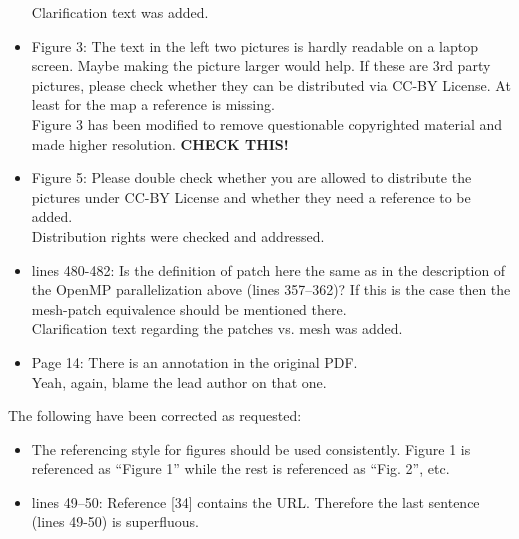 \documentclass{letter}
\newcommand{\alert}[1]{\textbf{\color{red} #1}}
\begin{document}
\begin{letter}
\begin{itemize}
    Clarification text was added. \\

    \item Figure 3:  The text in the left two pictures is hardly readable on a
    laptop screen. Maybe making the picture larger would help. If these are 3rd
    party pictures, please check whether they can be distributed via CC-BY
    License. At least for the map a reference is missing. \\

    Figure 3 has been modified to remove questionable copyrighted material and
    made higher resolution. \alert{CHECK THIS!} \\

    \item Figure 5:  Please double check whether you are allowed to distribute
    the pictures under CC-BY License and whether they need a reference to be
    added. \\

    Distribution rights were checked and addressed. \\

    \item lines 480-482: Is the definition of patch here the same as in the
    description of the OpenMP parallelization above (lines 357--362)? If this is
    the case then the mesh-patch equivalence should be mentioned there. \\

    Clarification text regarding the patches vs. mesh was added. \\

    \item Page 14:  There is an annotation in the original PDF. \\

    Yeah, again, blame the lead author on that one.

\end{itemize}

The following have been corrected as requested:
\begin{itemize}
    \item The referencing style for figures should be used consistently. Figure
    1 is referenced as ``Figure 1'' while the rest is referenced as ``Fig. 2'',
    etc.

    \item lines 49--50: Reference [34] contains the URL. Therefore the last
    sentence (lines 49-50) is superfluous.


\end{itemize}
\end{letter}
\end{document}
